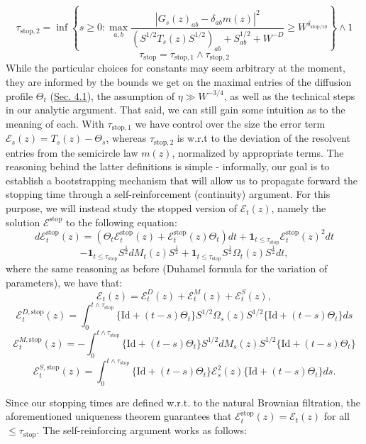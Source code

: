 \documentclass[11pt]{article}
\newcommand{\E}{\mathcal{E}}
\newcommand{\sto}{\text{stop}}
\begin{document}
\begin{equation*}
\tau_{\text{stop}, 2}=\inf \left\{s\geq 0: \max_{a, b} 
\frac{|G_s(z)_{ab}-\delta_{ab}m(z)|^2}{(S^{1/2}T_s(z)S^{1/2})_{ab}+S_{ab}^{1/2}+W^{-D}}\geq W^{\delta_{\sto/10}}
\right\}\wedge 1
\tag{3.4.2}
\end{equation*}
\begin{equation*}
\tau_\sto = \tau_{\sto, 1}\wedge \tau_{\sto, 2}\tag{3.4.2}
\end{equation*}
\noindent While the particular choices for constants may seem arbitrary at the moment, they are informed by the bounds we get on the maximal entries of the diffusion profile $\Theta_t$ (\hyperref[diffusion]{Sec. 4.1}), the assumption of $\eta\gg W^{-3/4}$, as well as the technical steps in our analytic argument. That said, we can still gain some intuition as to the meaning of each. With $\tau_{\text{stop},1}$ we have control over the size the error term $\E_s(z) = T_s(z) - \Theta_s$, whereas $\tau_{\text{stop},2}$ is w.r.t to the deviation of the resolvent entries from the semicircle law $m(z)$, normalized by appropriate terms. The reasoning behind the latter definitions is simple - informally, our goal is to establish a bootstrapping mechanism that will allow us to propagate forward the stopping time through a self-reinforcement (continuity) argument. For this purpose, we will instead study the stopped version of $\E_t(z)$, namely the solution $\E^\sto$  to the following equation: $$d\E_t^{\sto}(z) = \left(\Theta_t\E_t^{\sto}(z)+\E_t^{\sto}(z)\Theta_t\right)dt + \mathbf{1}_{t\leq \tau_\sto}\E_t^\sto (z)^2dt$$
$$-\mathbf{1}_{t\leq \tau_\sto}S^{\frac{1}{2}}dM_t(z)S^{\frac{1}{2}}+\mathbf{1}_{t\leq \tau_\sto} S^{\frac{1}{2}}\Omega_t(z)S^{\frac{1}{2}}dt,$$
where the same reasoning as before (Duhamel formula for the variation of parameters), we have that: \begin{equation*}\E_t(z)=\E_t^{D}(z)+\E_t^{M}(z)+\E_t^{S}(z),\tag{3.5}\end{equation*}
$$\E_t^{D, \sto}(z)=\int_0^{t\wedge\tau_\sto} \{\text{Id} + (t-s)\Theta_t\} S^{1/2} \Omega_s(z) S^{1/2} \{\text{Id} + (t-s)\Theta_t\}ds$$
$$\E_t^{M, \sto}(z)=-\int_0^{t\wedge\tau_\sto} \{\text{Id} + (t-s)\Theta_t\}S^{1/2} dM_s(z)S^{1/2}\{\text{Id} +(t-s)\Theta_t\}$$
$$\E_t^{S, \sto}(z)=\int_0^{t\wedge\tau_\sto} \{\text{Id} + (t-s)\Theta_t\}\E_s^2(z) \{\text{Id} + (t-s)\Theta_t\}ds.$$

\noindent Since our stopping times are defined w.r.t. to the natural Brownian filtration, the aforementioned uniqueness theorem guarantees that $\E_t^\sto(z) = \E_t(z)$ for all $\leq \tau_\sto$.  The self-reinforcing argument works as follows:
\end{document}
